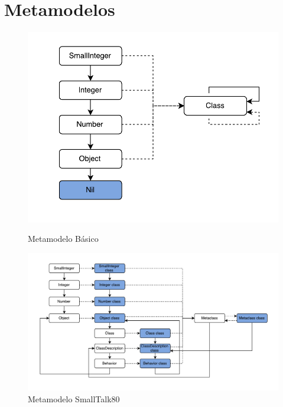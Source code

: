 \section{Metamodelos}

\begin{figure}[H]
\centering
\begin{minipage}{.4\textwidth}
  \centering
  \includegraphics[width=\linewidth]{images/metamodelo_smalltalk_basico.pdf}
  \caption{Metamodelo B\'asico}
  \label{fig:metamodelo_basico}
\end{minipage}%
\begin{minipage}{.6\textwidth}
  \centering
  \includegraphics[width=1.2\linewidth]{images/metamodelo_smalltalk_80.pdf}
  \caption{Metamodelo SmallTalk80}
  \label{fig:metamodelo_st80}
\end{minipage}
\label{fig:test}
\end{figure}

